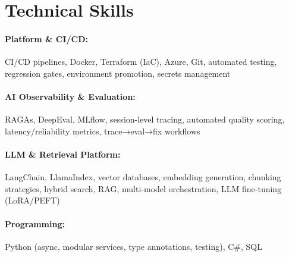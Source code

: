 \documentclass[10pt, letterpaper]{article}
\newenvironment{onecolentry}{
    \begin{adjustwidth}{
        0 cm + 0.00001 cm
    }{
        0 cm + 0.00001 cm
    }
}{
    \end{adjustwidth}
} %
\begin{document}
        




\vspace{-1mm}
\section{Technical Skills}

        \paragraph{Platform \& CI/CD:} CI/CD pipelines, Docker, Terraform (IaC), Azure, Git, automated testing, regression gates, environment promotion, secrets management
        \vspace{-4mm}
        \paragraph{AI Observability \& Evaluation:} RAGAs, DeepEval, MLflow, session-level tracing, automated quality scoring, latency/reliability metrics, trace→eval→fix workflows
        \vspace{-4mm}
        \paragraph{LLM \& Retrieval Platform:} LangChain, LlamaIndex, vector databases, embedding generation, chunking strategies, hybrid search, RAG, multi-model orchestration, LLM fine-tuning (LoRA/PEFT)
        \vspace{-4mm}
        \paragraph{Programming:} Python (async, modular services, type annotations, testing), C\#, SQL
\end{document}
